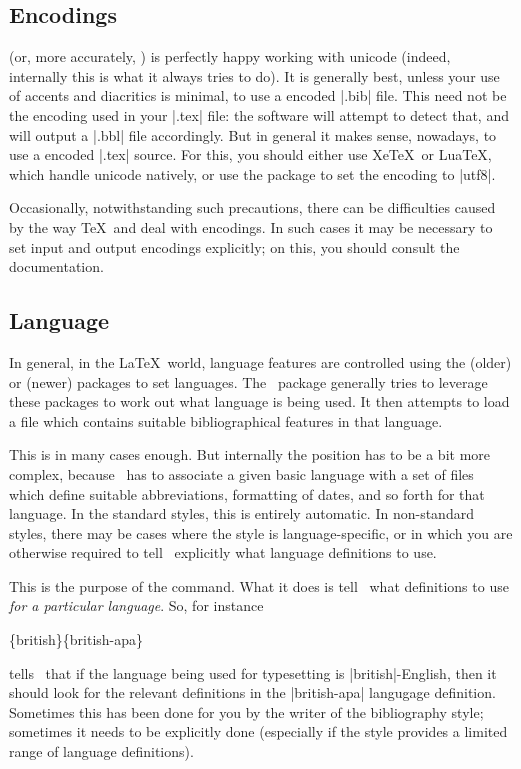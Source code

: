 \subsection{Encodings}

 (or, more accurately, ) is perfectly happy working with unicode (indeed, internally this is what it always tries to do). It is generally best, unless your use of accents and diacritics is minimal, to use a  encoded |.bib| file. This need not be the encoding used in your |.tex| file: the software will attempt to detect that, and will output a |.bbl| file accordingly. But in general it makes sense, nowadays, to use a  encoded |.tex| source. For this, you should either use Xe\TeX\ or Lua\TeX, which handle unicode natively, or use the  package to set the encoding to |utf8|.

Occasionally, notwithstanding such precautions, there can be difficulties caused by the way \TeX\ and  deal with encodings. In such cases it may be necessary to set input and output encodings explicitly; on this, you should consult the  documentation.

\subsection{Language}

In general, in the \LaTeX\ world, language features are controlled using the (older)  or (newer)  packages to set languages. The \biblatex\ package generally tries to leverage these packages to work out what language is being used. It then attempts to load a file which contains suitable bibliographical features in that language.

This is in many cases enough. But internally the position has to be a bit more complex, because \biblatex\ has to associate a given basic language with a set of files which define suitable abbreviations, formatting of dates, and so forth for that language. In the standard styles, this is entirely automatic. In non-standard styles, there may be cases where the style is language-specific, or in which you are otherwise required to tell \biblatex\ explicitly what language definitions to use.

This is the purpose of the  command. What it does is tell \biblatex\ what definitions to use \emph{for a particular language}. So, for instance
\begin{pseudoverb}
\{british\}\{british-apa\}
\end{pseudoverb}
tells \biblatex\ that if the language being used for typesetting is |british|-English, then it should look for the relevant definitions in the |british-apa| langugage definition. Sometimes this has been done for you by the writer of the bibliography style; sometimes it needs to be explicitly done (especially if the style provides a limited range of language definitions).

